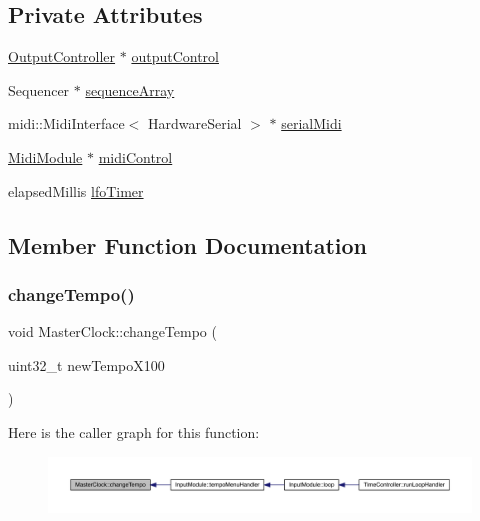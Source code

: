 \subsection*{Private Attributes}
\begin{DoxyCompactItemize}
\item 
\hyperlink{class_output_controller}{Output\+Controller} $\ast$ \hyperlink{class_master_clock_a6ec5b571edf2361d6c02834dec70fc09}{output\+Control}
\item 
Sequencer $\ast$ \hyperlink{class_master_clock_a5e1a8b89151a6f5698e0ee3a0923e7bb}{sequence\+Array}
\item 
midi\+::\+Midi\+Interface$<$ Hardware\+Serial $>$ $\ast$ \hyperlink{class_master_clock_a4c93dc002c3c69bd93a4b694a9ae0834}{serial\+Midi}
\item 
\hyperlink{class_midi_module}{Midi\+Module} $\ast$ \hyperlink{class_master_clock_ac38ecfe6fdbbe0d43fb7b09d32dd4999}{midi\+Control}
\item 
elapsed\+Millis \hyperlink{class_master_clock_a23fa94160f59287a003b39676ef7a5a8}{lfo\+Timer}
\end{DoxyCompactItemize}


\subsection{Member Function Documentation}
\mbox{\label{class_master_clock_a81cfc025162075b165cd8ff93da5489a}} 
\subsubsection{\texorpdfstring{change\+Tempo()}{changeTempo()}}
{\footnotesize\ttfamily void Master\+Clock\+::change\+Tempo (\begin{DoxyParamCaption}\item[{uint32\+\_\+t}]{new\+Tempo\+X100 }\end{DoxyParamCaption})}

Here is the caller graph for this function\+:
\nopagebreak
\begin{figure}[H]
\begin{center}
\leavevmode
\includegraphics[width=350pt]{class_master_clock_a81cfc025162075b165cd8ff93da5489a_icgraph}
\end{center}
\end{figure}
\mbox{\label{class_master_clock_a94e8a4d26a0bb028a132d7582d602f01}} 
